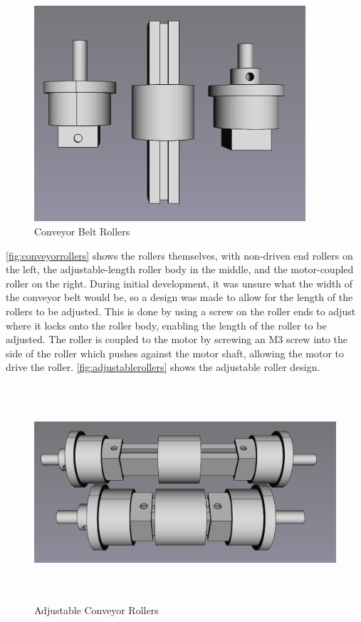 \begin{figure}[H]
    \begin{minipage}[h]{0.95\textwidth}
        \centering
        \includegraphics[height=8cm]{imgs/freecad/rollers.jpg}
        \caption{Conveyor Belt Rollers}
        \label{fig:conveyorrollers}
    \end{minipage}
\end{figure}

\autoref{fig:conveyorrollers} shows the rollers themselves, with non-driven end rollers on the left, the adjustable-length roller body in the middle, and the motor-coupled roller on the right. During initial development, it was unsure what the width of the conveyor belt would be, so a design was made to allow for the length of the rollers to be adjusted. This is done by using a screw on the roller ends to adjust where it locks onto the roller body, enabling the length of the roller to be adjusted. The roller is coupled to the motor by screwing an M3 screw into the side of the roller which pushes against the motor shaft, allowing the motor to drive the roller. \autoref{fig:adjustablerollers} shows the adjustable roller design.

\begin{figure}[H]
    \begin{minipage}[h]{\textwidth}
        \centering
        \includegraphics[height=8cm]{imgs/freecad/adjustablerollers.jpg}
        \caption{Adjustable Conveyor Rollers}
        \label{fig:adjustablerollers}
    \end{minipage}
\end{figure}

